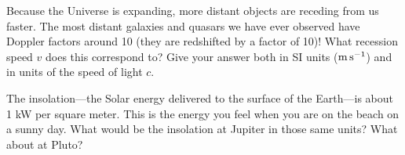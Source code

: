 \documentclass[12pt, letterpaper]{article}
\begin{document}
\begin{problem}
Because the Universe is expanding, more distant objects are receding from us faster.
The most distant galaxies and quasars we have ever observed have Doppler factors
around 10 (they are redshifted by a factor of 10)!
What recession speed $v$ does this correspond to?
Give your answer both in SI units ($\mathrm{m}\,\mathrm{s}^{-1}$) and in units of the speed of light $c$.
\end{problem}

\begin{problem}
The insolation---the Solar energy delivered to the surface of the
Earth---is about 1 kW per square meter. This is the energy you feel
when you are on the beach on a sunny day. What would be the insolation
at Jupiter in those same units?  What about at Pluto?
\end{problem}
\end{document}
